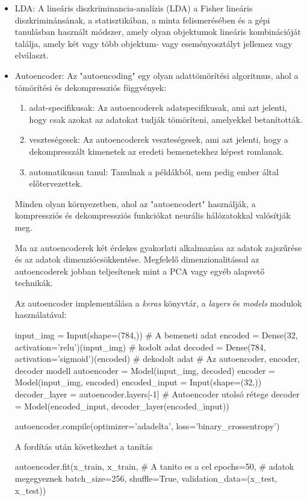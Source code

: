 \begin{itemize}
\item LDA: A lineáris diszkriminancia-analízis (LDA) a Fisher lineáris diszkriminánsának, a statisztikában, a minta felismerésében és a gépi tanulásban használt módszer, amely olyan objektumok lineáris kombinációját találja, amely két vagy több objektum- vagy eseményosztályt jellemez vagy elválaszt.
\item Autoencoder: Az "autoencoding" egy olyan adattömörítési algoritmus, ahol a tömörítési és dekompressziós függvények:
\begin{enumerate}
\item adat-specifikusak: Az autoencoderek adatspecifikusak, ami azt jelenti, hogy csak azokat az adatokat tudják tömöríteni, amelyekkel betanították.
\item veszteségesek: Az autoencoderek veszteségesek, ami azt jelenti, hogy a dekompresszált kimenetek az eredeti bemenetekhez képest romlanak.
\item automatikusan tanul: Tanulnak a példákból, nem pedig ember által előtervezettek.
\end{enumerate}
Minden olyan környezetben, ahol az "autoencodert" használják, a kompressziós és dekompressziós funkciókat neurális hálózatokkal valósítják meg.

Ma az autoencoderek két érdekes gyakorlati alkalmazása az adatok zajszűrése és az adatok dimenziócsökkentése. Megfelelő dimenzionalitással az autoencoderek jobban teljesítenek mint a PCA vagy egyéb alapvető technikák.

Az autoencoder implementálása a \textit{keras} könyvtár, a  \textit{layers} és \textit{models} modulok használatával:
\begin{python}

input_img = Input(shape=(784,)) # A bemeneti adat
encoded = Dense(32, activation='relu')(input_img) # kodolt adat
decoded = Dense(784, activation='sigmoid')(encoded) # dekodolt adat
# Az autoencoder, encoder, decoder modell
autoencoder = Model(input_img, decoded)
encoder = Model(input_img, encoded)
encoded_input = Input(shape=(32,))
decoder_layer = autoencoder.layers[-1] # Autoencoder utolsó rétege
decoder = Model(encoded_input, decoder_layer(encoded_input))
\end{python}
\begin{python}
autoencoder.compile(optimizer='adadelta', loss='binary_crossentropy')
\end{python}
A fordítás után következhet a tanítás
\begin{python}
autoencoder.fit(x_train, x_train,	# A tanito es a cel
                epochs=50,		# adatok megegyeznek
                batch_size=256,
                shuffle=True,
                validation_data=(x_test, x_test))
\end{python}
\end{itemize}

